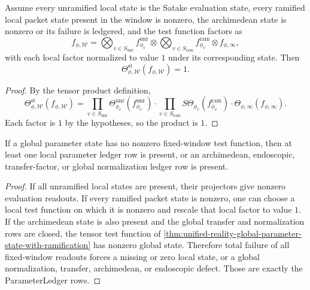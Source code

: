 \begin{theorem}
\label{thm:unified-reality-global-parameter-state-with-ramification}
Assume every unramified local state is the Satake evaluation state,
every ramified local packet state present in the window is nonzero,
the archimedean state is nonzero or its failure is ledgered, and the
test function factors as
$$
f_{\phi,\mathcal W}
=
\bigotimes_{v\in S_{\mathrm{unr}}}f_{\phi_v}^{\mathrm{unr}}
\otimes
\bigotimes_{v\in S_{\mathrm{ram}}}f_{\phi_v}^{\mathrm{ram}}
\otimes
f_{\phi,\infty},
$$
with each local factor normalized to value $1$ under its corresponding
state. Then
$$
\Theta_{\phi,\mathcal W}^{\mathrm{st}}(f_{\phi,\mathcal W})=1.
$$
\end{theorem}
\begin{proof}
By the tensor product definition,
$$
\Theta_{\phi,\mathcal W}^{\mathrm{st}}(f_{\phi,\mathcal W})
=
\prod_{v\in S_{\mathrm{unr}}}
\Theta_{\phi_v}^{\mathrm{unr}}(f_{\phi_v}^{\mathrm{unr}})
\cdot
\prod_{v\in S_{\mathrm{ram}}}
S\Theta_{\phi_v}(f_{\phi_v}^{\mathrm{ram}})
\cdot
\Theta_{\phi,\infty}(f_{\phi,\infty}).
$$
Each factor is $1$ by the hypotheses, so the product is $1$.
\end{proof}

\begin{theorem}
\label{thm:unified-reality-local-global-parameter-ledger-dichotomy}
If a global parameter state has no nonzero fixed-window test function,
then at least one local parameter ledger row is present, or an
archimedean, endoscopic, transfer-factor, or global normalization ledger
row is present.
\end{theorem}
\begin{proof}
If all unramified local states are present, their projectors give
nonzero evaluation readouts. If every ramified packet state is nonzero,
one can choose a local test function on which it is nonzero and rescale
that local factor to value $1$. If the archimedean state is also present
and the global transfer and normalization rows are closed, the tensor
test function of
\autoref{thm:unified-reality-global-parameter-state-with-ramification}
has nonzero global state. Therefore total failure of all fixed-window
readouts forces a missing or zero local state, or a global normalization,
transfer, archimedean, or endoscopic defect. Those are exactly the
ParameterLedger rows.
\end{proof}

